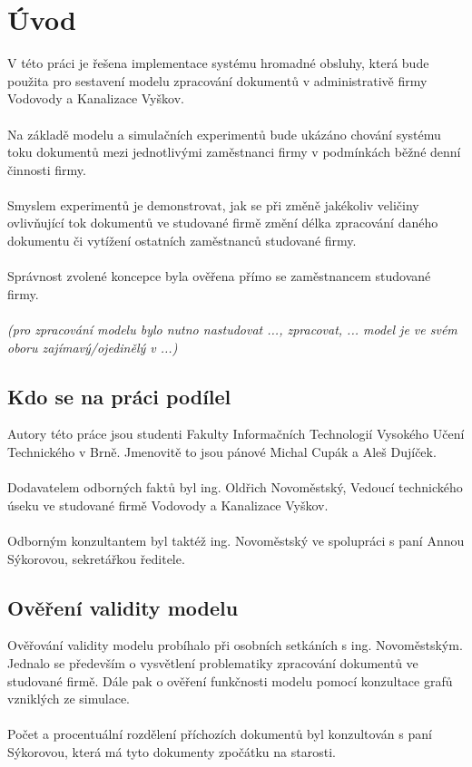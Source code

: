 \documentclass[a4paper]{article}
\begin{document}


\thispagestyle{empty}
\tableofcontents
\newpage

\section{Úvod}
V této práci je řešena implementace systému hromadné obsluhy, která bude použita pro 
sestavení modelu zpracování dokumentů v administrativě firmy Vodovody a Kanalizace Vyškov.\\
\\
Na základě modelu a simulačních experimentů bude ukázáno 
chování systému toku dokumentů mezi jednotlivými zaměstnanci firmy v podmínkách běžné denní činnosti firmy.\\ 
\\
Smyslem experimentů je demonstrovat, jak se při změně jakékoliv veličiny ovlivňující tok dokumentů ve studované firmě změní délka zpracování daného dokumentu či vytížení ostatních zaměstnanců studované firmy.\\
\\
Správnost zvolené koncepce byla ověřena přímo se zaměstnancem studované firmy.\\
\\
\textit{(pro zpracování modelu bylo nutno nastudovat ..., zpracovat, ... model je ve svém oboru zajímavý/ojedinělý v ...)}

\subsection{Kdo se na práci podílel}
Autory této práce jsou studenti Fakulty Informačních Technologií Vysokého Učení Technického v Brně. Jmenovitě to jsou pánové Michal Cupák a Aleš Dujíček.\\
\\
Dodavatelem odborných faktů byl ing. Oldřich Novoměstský, Vedoucí technického úseku ve studované firmě Vodovody a Kanalizace Vyškov.\\
\\
Odborným konzultantem byl taktéž ing. Novoměstský ve spolupráci s paní Annou Sýkorovou, sekretářkou ředitele.

\subsection{Ověření validity modelu}
Ověřování validity modelu probíhalo při osobních setkáních s ing. Novoměstským. Jednalo se především o vysvětlení problematiky zpracování dokumentů ve studované firmě. Dále pak o ověření funkčnosti modelu pomocí konzultace grafů vzniklých ze simulace.\\
\\
Počet a procentuální rozdělení příchozích dokumentů byl konzultován s paní Sýkorovou, která má tyto dokumenty zpočátku na starosti.
\end{document}
